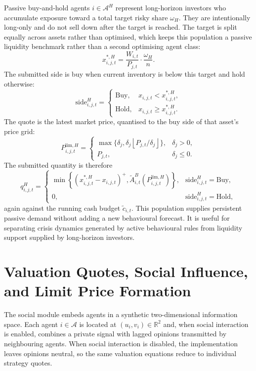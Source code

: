\documentclass[12pt, a4paper]{article}
\newcommand{\pospart}[1]{\left(#1\right)^{+}}
\begin{document}
    Passive buy-and-hold agents \(i\in\mathcal{A}^H\) represent long-horizon
    investors who accumulate exposure toward a total target risky share
    \(\omega_H\). They are intentionally long-only and do not sell down after the
    target is reached. The target is split equally across assets rather than
    optimised, which keeps this population a passive liquidity benchmark rather
    than a second optimising agent class:
    \[
        x_{i,j,t}^{\ast,H}
        =
        \frac{W_{i,t}}{P_{j,t}}\cdot\frac{\omega_H}{n}.
    \]
    The submitted side is buy when current inventory is below this target and
    hold otherwise:
    \[
        \mathrm{side}_{i,j,t}^{H}
        =
        \begin{cases}
            \mathrm{Buy}, & x_{i,j,t}<x_{i,j,t}^{\ast,H},\\
            \mathrm{Hold}, & x_{i,j,t}\ge x_{i,j,t}^{\ast,H}.
        \end{cases}
    \]
    The quote is the latest market price, quantised to the buy side of that
    asset's price grid:
    \[
        P_{i,j,t}^{\text{lim},H}
        =
        \begin{cases}
            \max\{\delta_j,\delta_j\left\lfloor P_{j,t}/\delta_j\right\rfloor\}, & \delta_j>0,\\
            P_{j,t}, & \delta_j\le 0.
        \end{cases}
    \]
    The submitted quantity is therefore
    \[
        q_{i,j,t}^{H}
        =
        \begin{cases}
            \min\left\{\pospart{x_{i,j,t}^{\ast,H}-x_{i,j,t}},
            \tilde A_{i,t}^{B}(P_{i,j,t}^{\text{lim},H})\right\}, & \mathrm{side}_{i,j,t}^{H}=\mathrm{Buy},\\[1.2ex]
            0, & \mathrm{side}_{i,j,t}^{H}=\mathrm{Hold},
        \end{cases}
    \]
    again against the running cash budget \(\tilde c_{i,t}\).
    This population supplies persistent passive demand without adding a new
    behavioural forecast. It is useful for separating crisis dynamics generated by
    active behavioural rules from liquidity support supplied by long-horizon
    investors.

    \section{Valuation Quotes, Social Influence, and Limit Price Formation}\label{sec:valuation_quotes}

    The social module embeds agents in a synthetic two-dimensional information
    space. Each agent \(i\in\mathcal{A}\) is located at
    \((u_i,v_i)\in\mathbb{R}^2\) and, when social interaction is enabled, combines
    a private signal with lagged opinions transmitted by neighbouring agents. When
    social interaction is disabled, the implementation leaves opinions neutral, so
    the same valuation equations reduce to individual strategy quotes.
\end{document}
